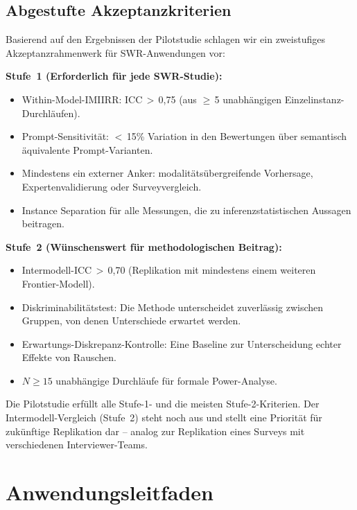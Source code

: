 \documentclass[11pt,a4paper]{article}
\begin{document}
\subsection{Abgestufte Akzeptanzkriterien}
\label{sec:qa:tiers}

Basierend auf den Ergebnissen der Pilotstudie schlagen wir ein zweistufiges Akzeptanzrahmenwerk f\"ur SWR-Anwendungen vor:

\textbf{Stufe~1 (Erforderlich f\"ur jede SWR-Studie):}
\begin{itemize}[nosep]
  \item Within-Model-IMIIRR: ICC\,$>$\,0,75 (aus $\geq$\,5 unabh\"angigen Einzelinstanz-Durchl\"aufen).
  \item Prompt-Sensitivit\"at: $<$\,15\% Variation in den Bewertungen \"uber semantisch \"aquivalente Prompt-Varianten.
  \item Mindestens ein externer Anker: modalit\"ats\"ubergreifende Vorhersage, Expertenvalidierung oder Surveyvergleich.
  \item Instance Separation f\"ur alle Messungen, die zu inferenzstatistischen Aussagen beitragen.
\end{itemize}

\textbf{Stufe~2 (W\"unschenswert f\"ur methodologischen Beitrag):}
\begin{itemize}[nosep]
  \item Intermodell-ICC\,$>$\,0,70 (Replikation mit mindestens einem weiteren Frontier-Modell).
  \item Diskriminabilit\"atstest: Die Methode unterscheidet zuverl\"assig zwischen Gruppen, von denen Unterschiede erwartet werden.
  \item Erwartungs-Diskrepanz-Kontrolle: Eine Baseline zur Unterscheidung echter Effekte von Rauschen.
  \item $N \geq 15$ unabh\"angige Durchl\"aufe f\"ur formale Power-Analyse.
\end{itemize}

Die Pilotstudie erf\"ullt alle Stufe-1- und die meisten Stufe-2-Kriterien. Der Intermodell-Vergleich (Stufe~2) steht noch aus und stellt eine Priorit\"at f\"ur zuk\"unftige Replikation dar -- analog zur Replikation eines Surveys mit verschiedenen Interviewer-Teams.


\section{Anwendungsleitfaden}
\label{sec:application}
\end{document}

